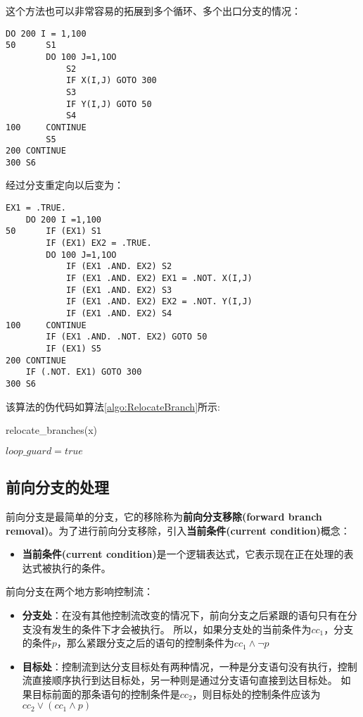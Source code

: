\documentclass[11pt,a4paper]{article}
\begin{document}
这个方法也可以非常容易的拓展到多个循环、多个出口分支的情况：
\begin{lstlisting}[language=FORTRAN]
	DO 200 I = 1,100
50		S1
		DO 100 J=1,1OO
			S2
			IF X(I,J) GOTO 300
			S3
			IF Y(I,J) GOTO 50
			S4
100		CONTINUE
		S5
200	CONTINUE
300	S6
\end{lstlisting}
经过分支重定向以后变为：
\begin{lstlisting}[language=FORTRAN]
	EX1 = .TRUE.
	DO 200 I =1,100
50		IF (EX1) S1
		IF (EX1) EX2 = .TRUE.
		DO 100 J=1,1OO
			IF (EX1 .AND. EX2) S2
			IF (EX1 .AND. EX2) EX1 = .NOT. X(I,J)
			IF (EX1 .AND. EX2) S3
			IF (EX1 .AND. EX2) EX2 = .NOT. Y(I,J)
			IF (EX1 .AND. EX2) S4
100		CONTINUE
		IF (EX1 .AND. .NOT. EX2) GOTO 50
		IF (EX1) S5
200	CONTINUE
	IF (.NOT. EX1) GOTO 300
300	S6
\end{lstlisting}
该算法的伪代码如算法\ref{algo:RelocateBranch}所示:

\begin{algorithm}[H]
	\label{algo:RelocateBranch}
	\caption{relocate\_branches(x)}
	$loop\_guard = true$\;
\end{algorithm}

\subsection{前向分支的处理}

前向分支是最简单的分支，它的移除称为\textbf{前向分支移除(forward branch removal)}。为了进行前向分支移除，引入\textbf{当前条件(current condition)}概念：

\begin{itemize}
\item \textbf{当前条件(current condition)}是一个逻辑表达式，它表示现在正在处理的表达式被执行的条件。
\end{itemize}

前向分支在两个地方影响控制流：

\begin{itemize}
\item \textbf{分支处}：在没有其他控制流改变的情况下，前向分支之后紧跟的语句只有在分支没有发生的条件下才会被执行。
所以，如果分支处的当前条件为$cc_1$，分支的条件$p$，那么紧跟分支之后的语句的控制条件为$cc_1\wedge \neg p$
\item \textbf{目标处}：控制流到达分支目标处有两种情况，一种是分支语句没有执行，控制流直接顺序执行到达目标处，另一种则是通过分支语句直接到达目标处。
如果目标前面的那条语句的控制条件是$cc_2$，则目标处的控制条件应该为$cc_2\vee \left(cc_1\wedge p\right)$
\end{itemize}
\end{document}
